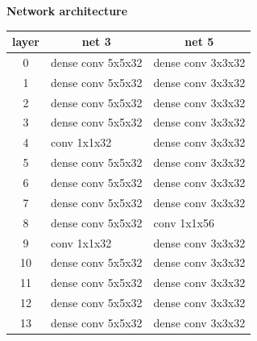 \documentclass[xcolor=dvipsnames]{beamer}
\begin{document}
\begin{frame}{\bf Network architecture}

{\fontsize{8}{6}\selectfont

\begin{table}[]
\begin{tabular}{|c|l|l|}
\hline
\textbf{layer} & \multicolumn{1}{c|}{\textbf{net 3}}       & \multicolumn{1}{c|}{\textbf{net 5}}       \\ \hline
0              & \cellcolor[HTML]{FD6864}dense conv 5x5x32 & \cellcolor[HTML]{FD6864}dense conv 3x3x32 \\ \hline
1              & \cellcolor[HTML]{FD6864}dense conv 5x5x32 & \cellcolor[HTML]{FD6864}dense conv 3x3x32 \\ \hline
2              & \cellcolor[HTML]{FD6864}dense conv 5x5x32 & \cellcolor[HTML]{FD6864}dense conv 3x3x32 \\ \hline
3              & \cellcolor[HTML]{FD6864}dense conv 5x5x32 & \cellcolor[HTML]{FD6864}dense conv 3x3x32 \\ \hline
4              & \cellcolor[HTML]{38FFF8}conv 1x1x32       & \cellcolor[HTML]{FD6864}dense conv 3x3x32 \\ \hline
5              & \cellcolor[HTML]{FD6864}dense conv 5x5x32 & \cellcolor[HTML]{FD6864}dense conv 3x3x32 \\ \hline
6              & \cellcolor[HTML]{FD6864}dense conv 5x5x32 & \cellcolor[HTML]{FD6864}dense conv 3x3x32 \\ \hline
7              & \cellcolor[HTML]{FD6864}dense conv 5x5x32 & \cellcolor[HTML]{FD6864}dense conv 3x3x32 \\ \hline
8              & \cellcolor[HTML]{FD6864}dense conv 5x5x32 & \cellcolor[HTML]{38FFF8}conv 1x1x56       \\ \hline
9              & \cellcolor[HTML]{38FFF8}conv 1x1x32       & \cellcolor[HTML]{FD6864}dense conv 3x3x32 \\ \hline
10             & \cellcolor[HTML]{FD6864}dense conv 5x5x32 & \cellcolor[HTML]{FD6864}dense conv 3x3x32 \\ \hline
11             & \cellcolor[HTML]{FD6864}dense conv 5x5x32 & \cellcolor[HTML]{FD6864}dense conv 3x3x32 \\ \hline
12             & \cellcolor[HTML]{FD6864}dense conv 5x5x32 & \cellcolor[HTML]{FD6864}dense conv 3x3x32 \\ \hline
13             & \cellcolor[HTML]{FD6864}dense conv 5x5x32 & \cellcolor[HTML]{FD6864}dense conv 3x3x32 \\ \hline

\end{tabular}
\end{table}}
\end{frame}
\end{document}
